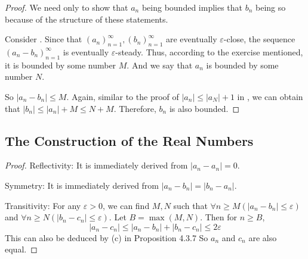 \begin{proof}
We need only to show that $a_n$ being bounded implies that $b_n$ being so because of the structure of these statements. 

Consider . Since that $(a_n)^\infty_{n=1},(b_n)^\infty_{n=1}$ are eventually $\varepsilon$-close, the sequence 
$(a_n-b_n)^\infty_{n=1}$ is eventually $\varepsilon$-steady. Thus, according to the exercise mentioned, it is bounded by some number $M$. And 
we say that $a_n$ is bounded by some number $N$.

So $|a_n-b_n| \leq M$. Again, similar to the proof of $|a_n| \leq |a_N|+1$ in , we can obtain that 
$|b_n| \leq |a_n| + M \leq N+M$. Therefore, $b_n$ is also bounded.
\end{proof}

\subsection{The Construction of the Real Numbers}
\begin{proof}
Reflectivity: It is immediately derived from $|a_n-a_n| = 0$.

Symmetry: It is immediately derived from $|a_n-b_n| = |b_n-a_n|$.

Transitivity: For any $\varepsilon >0$, we can find $M,N$ such that $\forall n\geq M(|a_n-b_n| \leq \varepsilon)$ and 
$\forall n\geq N(|b_n-c_n| \leq \varepsilon)$. Let $B = \max{(M,N)}$. Then for $n\geq B$,
\[
|a_n-c_n| \leq |a_n-b_n| + |b_n-c_n| \leq 2\varepsilon
\]
This can also be deduced by (c) in Proposition 4.3.7
So $a_n$ and $c_n$ are also equal.
\end{proof}

